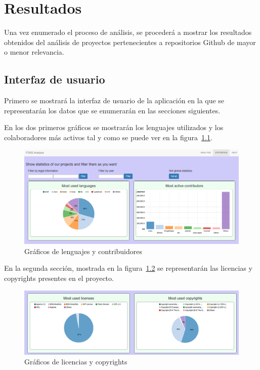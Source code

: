 \documentclass[a4paper, spanish, 12pt]{book}
\begin{document}
\cleardoublepage
\chapter{Resultados}

Una vez enumerado el proceso de an\'alisis, se proceder\'a a mostrar los resultados
obtenidos del an\'alisis de proyectos pertenecientes a repositorios Github de
mayor o menor relevancia.

\section{Interfaz de usuario}
\label{sec:user_interface}

Primero se mostrar\'a la interfaz de usuario de la aplicaci\'on en la que se representar\'an
los datos que se enumerar\'an en las secciones siguientes.

En los dos primeros gr\'aficos se mostrar\'an los lenguajes utilizados y los colaboradores
m\'as activos tal y como se puede ver en la figura~\ref{fig:first_row}.

\begin{figure}
  \centering
  \includegraphics[width=14cm, keepaspectratio]{img/first_row}
  \caption{Gr\'aficos de lenguajes y contribuidores}
  \label{fig:first_row}
\end{figure}

En la segunda secci\'on, mostrada en la figura~\ref{fig:second_row} se representar\'an
las licencias y copyrights presentes en el proyecto.

\begin{figure}
  \centering
  \includegraphics[width=14cm, keepaspectratio]{img/second_row}
  \caption{Gr\'aficos de licencias y copyrights}
  \label{fig:second_row}
\end{figure}
\end{document}
